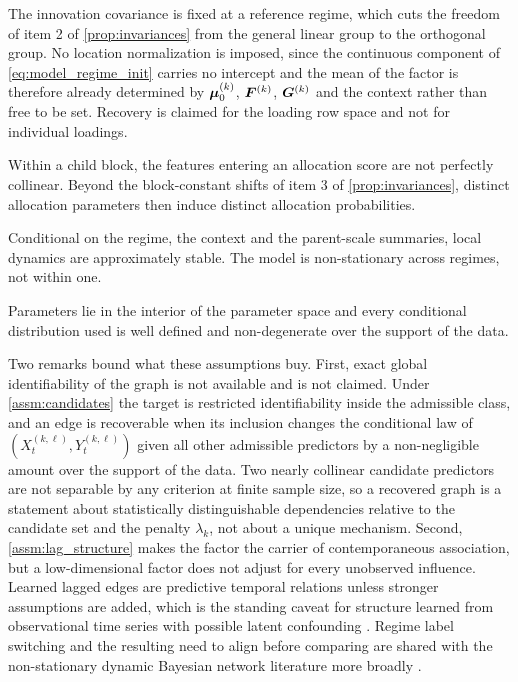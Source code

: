 \begin{assumption}
\label{assm:factor_normalization}
The innovation covariance is fixed at a reference regime, which cuts the
freedom of item 2 of \cref{prop:invariances} from the general linear group to
the orthogonal group. No location normalization is imposed, since
the continuous component of \cref{eq:model_regime_init} carries no intercept and the mean of the
factor is therefore already determined by ${\boldsymbol{\mu}}_0^{(k)}$, ${\bm{F}}^{(k)}$,
${\bm{G}}^{(k)}$ and the context rather than free to be set. Recovery is claimed for
the loading row space and not for individual loadings.
\end{assumption}

\begin{assumption}
\label{assm:nonredundancy}
Within a child block, the features entering an allocation score are not
perfectly collinear. Beyond the block-constant shifts of item 3 of
\cref{prop:invariances}, distinct allocation parameters then induce distinct
allocation probabilities.
\end{assumption}

\begin{assumption}
\label{assm:within_regime_stationarity}
Conditional on the regime, the context and the parent-scale summaries, local
dynamics are approximately stable. The model is non-stationary across regimes,
not within one.
\end{assumption}

\begin{assumption}[Regularity]
\label{assm:regularity}
Parameters lie in the interior of the parameter space and every conditional
distribution used is well defined and non-degenerate over the support of the
data.
\end{assumption}

Two remarks bound what these assumptions buy. First, exact global
identifiability of the graph is not available and is not claimed. Under
\cref{assm:candidates} the target is restricted identifiability inside the
admissible class, and an edge is recoverable when its inclusion changes the
conditional law of $(X_t^{(k,\ell)}, Y_t^{(k,\ell)})$ given all other
admissible predictors by a non-negligible amount over the support of the data.
Two nearly collinear candidate predictors are not separable by any criterion at
finite sample size, so a recovered graph is a statement about statistically
distinguishable dependencies relative to the candidate set and the penalty
$\lambda_k$, not about a unique mechanism. Second,
\cref{assm:lag_structure} makes the factor the carrier of contemporaneous
association, but a low-dimensional factor does not adjust for every unobserved
influence. Learned lagged edges are predictive temporal relations unless
stronger assumptions are added, which is the standing caveat for structure
learned from observational time series with possible latent confounding
\citep{gerhardus2020lpcmci}. Regime label switching and the resulting need to
align before comparing are shared with the non-stationary dynamic Bayesian
network literature more broadly
\citep{robinson2010nsdbn,grzegorczyk2011nhdbncontinuous}.

